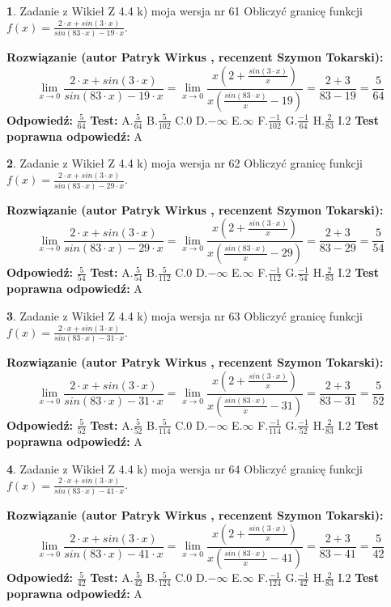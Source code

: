 \documentclass[12pt, a4paper]{article}
\theoremstyle{definition} %
\newtheorem{zad}{}
\newcommand{\zadStart}[1]{\begin{zad}#1\newline}
\newcommand{\zadStop}{\end{zad}}
\newcommand{\rozwStart}[2]{\noindent \textbf{Rozwiązanie (autor #1 , recenzent #2): }\newline}
\newcommand{\rozwStop}{\newline}
\newcommand{\odpStart}{\noindent \textbf{Odpowiedź:}\newline}
\newcommand{\odpStop}{\newline}
\newcommand{\testStart}{\noindent \textbf{Test:}\newline}
\newcommand{\testStop}{\newline}
\newcommand{\kluczStart}{\noindent \textbf{Test poprawna odpowiedź:}\newline}
\newcommand{\kluczStop}{\newline}
\begin{document}
\zadStart{Zadanie z Wikieł Z 4.4 k) moja wersja nr 61}
Obliczyć granicę funkcji $f(x)=\frac{2\cdot x +sin(3\cdot x)}{sin(83\cdot x) -19\cdot x}$.
\zadStop
\rozwStart{Patryk Wirkus}{Szymon Tokarski}
$$\lim\limits_{x\to 0}\frac{2\cdot x +sin(3\cdot x)}{sin(83\cdot x) -19\cdot x}
=\lim\limits_{x\to 0}\frac{x(2+\frac{sin(3\cdot x)}{x})}{x(\frac{sin(83\cdot x)}{x}-19)}
=\frac{2+3}{83-19} = \frac{5}{64}$$
\rozwStop
\odpStart
$\frac{5}{64}$
\odpStop
\testStart
A.$\frac{5}{64}$
B.$\frac{5}{102}$
C.$0$
D.$-\infty$
E.$\infty$
F.$\frac{-1}{102}$
G.$\frac{-1}{64}$
H.$\frac{2}{83}$
I.$2$
\testStop
\kluczStart
A
\kluczStop



\zadStart{Zadanie z Wikieł Z 4.4 k) moja wersja nr 62}
Obliczyć granicę funkcji $f(x)=\frac{2\cdot x +sin(3\cdot x)}{sin(83\cdot x) -29\cdot x}$.
\zadStop
\rozwStart{Patryk Wirkus}{Szymon Tokarski}
$$\lim\limits_{x\to 0}\frac{2\cdot x +sin(3\cdot x)}{sin(83\cdot x) -29\cdot x}
=\lim\limits_{x\to 0}\frac{x(2+\frac{sin(3\cdot x)}{x})}{x(\frac{sin(83\cdot x)}{x}-29)}
=\frac{2+3}{83-29} = \frac{5}{54}$$
\rozwStop
\odpStart
$\frac{5}{54}$
\odpStop
\testStart
A.$\frac{5}{54}$
B.$\frac{5}{112}$
C.$0$
D.$-\infty$
E.$\infty$
F.$\frac{-1}{112}$
G.$\frac{-1}{54}$
H.$\frac{2}{83}$
I.$2$
\testStop
\kluczStart
A
\kluczStop



\zadStart{Zadanie z Wikieł Z 4.4 k) moja wersja nr 63}
Obliczyć granicę funkcji $f(x)=\frac{2\cdot x +sin(3\cdot x)}{sin(83\cdot x) -31\cdot x}$.
\zadStop
\rozwStart{Patryk Wirkus}{Szymon Tokarski}
$$\lim\limits_{x\to 0}\frac{2\cdot x +sin(3\cdot x)}{sin(83\cdot x) -31\cdot x}
=\lim\limits_{x\to 0}\frac{x(2+\frac{sin(3\cdot x)}{x})}{x(\frac{sin(83\cdot x)}{x}-31)}
=\frac{2+3}{83-31} = \frac{5}{52}$$
\rozwStop
\odpStart
$\frac{5}{52}$
\odpStop
\testStart
A.$\frac{5}{52}$
B.$\frac{5}{114}$
C.$0$
D.$-\infty$
E.$\infty$
F.$\frac{-1}{114}$
G.$\frac{-1}{52}$
H.$\frac{2}{83}$
I.$2$
\testStop
\kluczStart
A
\kluczStop



\zadStart{Zadanie z Wikieł Z 4.4 k) moja wersja nr 64}
Obliczyć granicę funkcji $f(x)=\frac{2\cdot x +sin(3\cdot x)}{sin(83\cdot x) -41\cdot x}$.
\zadStop
\rozwStart{Patryk Wirkus}{Szymon Tokarski}
$$\lim\limits_{x\to 0}\frac{2\cdot x +sin(3\cdot x)}{sin(83\cdot x) -41\cdot x}
=\lim\limits_{x\to 0}\frac{x(2+\frac{sin(3\cdot x)}{x})}{x(\frac{sin(83\cdot x)}{x}-41)}
=\frac{2+3}{83-41} = \frac{5}{42}$$
\rozwStop
\odpStart
$\frac{5}{42}$
\odpStop
\testStart
A.$\frac{5}{42}$
B.$\frac{5}{124}$
C.$0$
D.$-\infty$
E.$\infty$
F.$\frac{-1}{124}$
G.$\frac{-1}{42}$
H.$\frac{2}{83}$
I.$2$
\testStop
\kluczStart
A
\kluczStop
\end{document}
